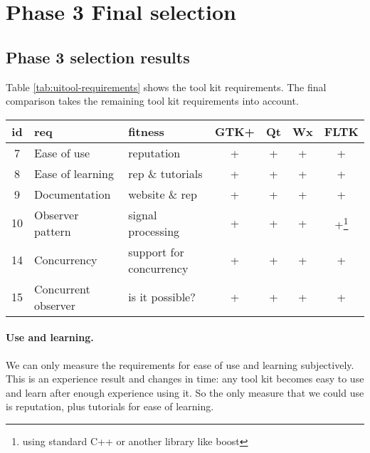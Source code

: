 \section{Phase 3 Final selection}

\subsection{Phase 3 selection results} 

Table \ref{tab:uitool-requirements} shows the tool kit requirements.  The final
comparison takes the remaining tool kit requirements into account.

\vspace{1em}
\begin{minipage}{.95\textwidth}
	\begin{center}
		\small\sf
		\begin{tabular}{|c|p{9em}|p{8em}|cccc|}
			\hline
			{\bf id} & {\bf req}             & {\bf fitness}           & {\bf GTK+} & {\bf Qt} & {\bf Wx} & {\bf FLTK}\\
			\hline
			    7    & Ease of use           & reputation              & +                      & + & + & +\\
			    8    & Ease of learning      & rep \& tutorials        & +                      & + & + & +\\
			    9    & Documentation         & website \& rep          & +                      & + & + & + \\
			    10   & Observer pattern      & signal processing       & +                      & + & + & 
			    +\footnote{using standard C++ or another library like boost\label{fn:c++}} \\
			    14   & Concurrency           & support for concurrency & +                      & + & + & +\footref{fn:c++} \\
			    15   & Concurrent observer   & is it possible?         & +                      & + & + & +\footref{fn:c++} \\
				\hline
		\end{tabular}
		\label{tab:final-comparison}
	\end{center}
\end{minipage}

\paragraph{Use and learning.} We can only measure the requirements for ease of
use and learning subjectively. This is an experience result and changes in
time: any tool kit becomes easy to use and learn after enough experience using
it. So the only measure that we could use is reputation, plus tutorials for
ease of learning. 

